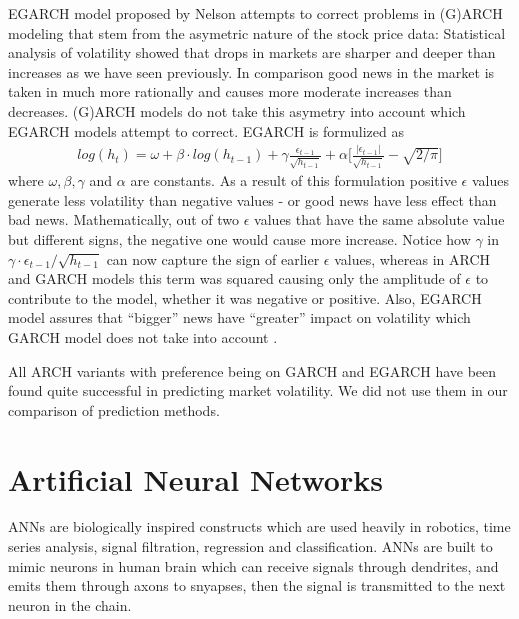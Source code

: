 EGARCH model proposed by Nelson \cite{nelson} attempts to correct problems in
(G)ARCH modeling that stem from the asymetric nature of the stock price data:
Statistical analysis of volatility showed that drops in markets are sharper and
deeper than increases as we have seen previously. In comparison good news in the
market is taken in much more rationally and causes more moderate increases than
decreases. (G)ARCH models do not take this asymetry into account which EGARCH
models attempt to correct. EGARCH is formulized as
\begin{eqnarray*}
log(h_t) = \omega + \beta \cdot log(h_{t-1}) + 
\gamma \frac{\epsilon_{t-1}}{\sqrt{h_{t-1}}} + 
\alpha \bigg[ \frac{|\epsilon_{t-1}|}{\sqrt{h_{t-1}}} - \sqrt{2 / \pi} \bigg]
\end{eqnarray*}
where $\omega,\beta,\gamma$ and $\alpha$ are constants. As a result of this
formulation positive $\epsilon$ values generate less volatility than negative
values - or good news have less effect than bad news. Mathematically, out of two
$\epsilon$ values that have the same absolute value but different signs, the
negative one would cause more increase. Notice how $\gamma$ in $\gamma \cdot
\epsilon_{t-1} / \sqrt{h_{t-1}}$ can now capture the sign of earlier $\epsilon$
values, whereas in ARCH and GARCH models this term was squared causing only the
amplitude of $\epsilon$ to contribute to the model, whether it was negative or
positive. Also, EGARCH model assures that ``bigger'' news have ``greater''
impact on volatility which GARCH model does not take into account \cite{engle2}.

All ARCH variants with preference being on GARCH and EGARCH have been found
quite successful in predicting market volatility. We did not use them in our
comparison of prediction methods. 

\section{Artificial Neural Networks}

ANNs are biologically inspired constructs which are used heavily in robotics,
time series analysis, signal filtration, regression and classification. ANNs are
built to mimic neurons in human brain which can receive signals through
dendrites, and emits them through axons to snyapses, then the signal is
transmitted to the next neuron in the chain.

